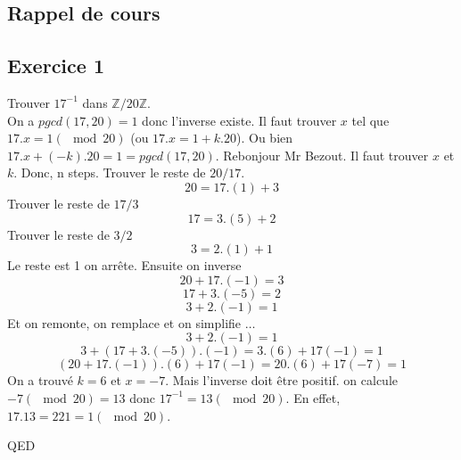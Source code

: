 \documentclass[]{book}
\theoremstyle{definition}
\newcommand{\bb}[1]{\mathbb{#1}}
\newcommand{\Z}{\bb{Z}}
\begin{document}
\subsection*{Rappel de cours}



\newpage
\subsection*{Exercice 1}
Trouver $17^{-1}$ dans $\Z/20\Z$.\\
On a $pgcd(17,20) = 1$ donc l'inverse existe. Il faut trouver $x$ tel que $17.x = 1 (\mod 20)$ (ou $17.x = 1 + k.20$). Ou bien $17.x + (-k).20 = 1 = pgcd(17,20)$. Rebonjour Mr Bezout. Il faut trouver $x$ et $k$. Donc, n steps. Trouver le reste de $20/17$.
$$20 = 17.(1) + 3$$
Trouver le reste de $17/3$
$$17=3.(5) + 2$$
Trouver le reste de $3/2$
$$3=2.(1)+1$$
Le reste est 1 on arr\^ete. Ensuite on inverse
$$20 + 17.(-1) = 3$$
$$17 + 3.(-5) = 2$$
$$3+2.(-1)=1$$
Et on remonte, on remplace et on simplifie $\ldots$
$$3+2.(-1)=1$$
$$3+(17 + 3.(-5)).(-1)= 3.(6) + 17(-1) =1$$
$$(20 + 17.(-1)).(6) + 17(-1) = 20.(6) + 17(-7) = 1$$
On a trouv\'e $k=6$ et $x=-7$. Mais l'inverse doit \^etre positif. on calcule $-7 (\mod 20) = 13$ donc $17^{-1} = 13 (\mod 20)$. En effet, $17.13 = 221 = 1 (\mod 20)$.


QED
\end{document}
